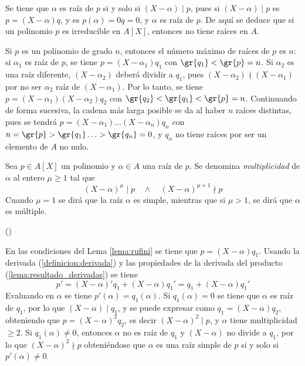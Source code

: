 \begin{obss}
        \item Se tiene que $\alpha$ es raíz de $p$ si y solo si $(X-\alpha)\mid p$, pues si $(X-\alpha)\mid p$ es $p = (X-\alpha)q$, y es $p(\alpha) = 0q  = 0$, y $\alpha$ es raíz de $p$.  De aquí se deduce que si un polinomio $p$ es irreducible en $A[X]$, entonces no tiene raíces en $A$.
        \item Si $p$ es un polinomio de grado $n$, entonces el número máximo de raíces de $p$ es $n$: si $\alpha_1$ es raíz de $p$, se tiene  $p = (X-\alpha_1)q_1$ con $\gr{q_1} < \gr{p} = n$. Si $\alpha_2$ es una raíz diferente, $(X-\alpha_2)$ deberá dividir a $q_1$, pues $(X-\alpha_2)\nmid (X-\alpha_1)$ por no ser $\alpha_2$ raíz  de $(X-\alpha_1)$. Por lo tanto, se tiene $p = (X-\alpha_1)(X-\alpha_2)q_2$ con $\gr{q_2} <\gr{q_1} < \gr{p} = n$. Continuando de forma sucesiva, la cadena más larga posible se da al haber $n$ raíces distintas, pues se tendrá $p =  (X-\alpha_1)\ldots(X-\alpha_n)q_n$ con $n = \gr{p}>\gr{q_1} \ldots> \gr{q_n} = 0$, y $q_n$ no tiene raíces por ser un elemento de $A$ no nulo.  
\end{obss}

\bigskip

\begin{deff}{\cite[p.~185]{GamboaAnillos}}
    Sea $p\in A[X]$ un polinomio y $\alpha \in A$ una raíz de $p$. Se denomina \textit{multiplicidad} de $\alpha$ al entero $\mu\geq1$ tal que \[ (X-\alpha)^\mu\mid p \quad \land \quad  (X-\alpha)^{\mu + 1}\nmid p\]
    Cuando $\mu = 1$ se dirá que la raíz $\alpha$ es simple, mientras que si $\mu>1$, se dirá que $\alpha$ es múltiple.
\end{deff}

\begin{prop}(\cite[p.~185]{GamboaAnillos})\label{proposicion:raiz simple-derivada}
     \item En las condiciones del Lema \ref{lema:rufini} se tiene que $p = (X-\alpha)q_1$. Usando la derivada (\ref{definicion:derivada}) y las propiedades de la derivada del producto (\ref{lema:resultado_derivadas}) se tiene \[p' = (X-\alpha)'q_1 + (X-\alpha)q_1' = q_1 + (X-\alpha)q_1'\]Evaluando en $\alpha$ se tiene $p' (\alpha) = q_1(\alpha)$. Si $q_1 (\alpha) = 0$ se tiene que $\alpha$ es raíz de $q_1$, por lo que $(X-\alpha)\mid q_1$, y se puede expresar como $q_1 = (X-\alpha)q_2$, obteniendo que $p = (X-\alpha)^2q_2$, es decir $(X-\alpha)^2\mid p$, y $\alpha$ tiene multiplicidad $\geq2$. Si $q_1 (\alpha) \neq 0$, entonces $\alpha$ no es raíz de $q_1$ y $(X-\alpha)$ no divide a $q_1$, por lo que $(X-\alpha)^2\nmid p$ obteniéndose que $\alpha$ es una raíz simple de $p$ si y solo si $p'(\alpha) \neq 0$.
\end{prop}

